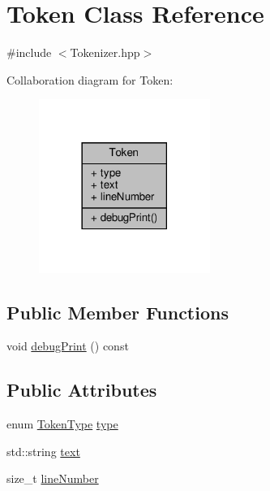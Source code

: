 \hypertarget{classft_1_1_token}{}\section{Token Class Reference}
\label{classft_1_1_token}


{\ttfamily \#include $<$Tokenizer.\+hpp$>$}



Collaboration diagram for Token\+:\nopagebreak
\begin{figure}[H]
\begin{center}
\leavevmode
\includegraphics[width=158pt]{classft_1_1_token__coll__graph}
\end{center}
\end{figure}
\subsection*{Public Member Functions}
\begin{DoxyCompactItemize}
\item 
void \hyperlink{classft_1_1_token_ad5cb0ada03653eb2e1c8947f05c07ad6}{debug\+Print} () const
\end{DoxyCompactItemize}
\subsection*{Public Attributes}
\begin{DoxyCompactItemize}
\item 
enum \hyperlink{namespaceft_aa520fbf142ba1e7e659590c07da31921}{Token\+Type} \hyperlink{classft_1_1_token_a9ba17ef6e6c544012e04da10a6d461e5}{type}
\item 
std\+::string \hyperlink{classft_1_1_token_a23c058547fbc73b5659191844a9f258c}{text}
\item 
size\+\_\+t \hyperlink{classft_1_1_token_a996a051ecda6b841e4b58246536a7006}{line\+Number}
\end{DoxyCompactItemize}


